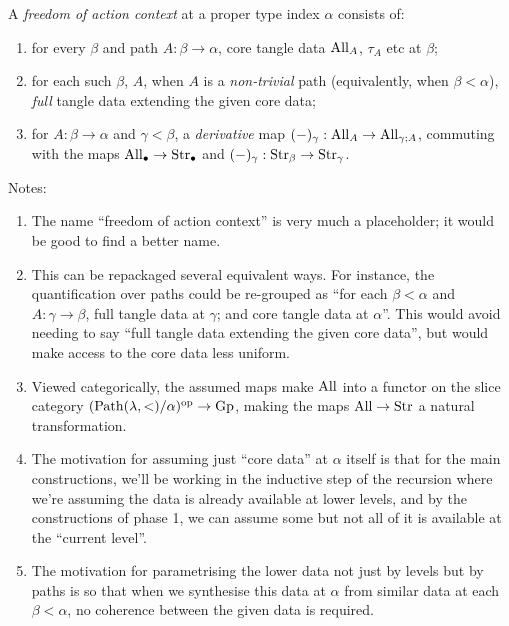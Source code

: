 \begin{definition}
  \label{def:foa-context}
  \leanok
  A \emph{freedom of action context} at a proper type index $\alpha$ consists of:

  \begin{enumerate}
  \item for every $\beta$ and path $A : \beta \to \alpha$, core tangle data $\mathrm{All}_A$, $\tau_A$ etc at $\beta$;
  \item for each such $\beta$, $A$, when $A$ is a \emph{non-trivial} path (equivalently, when $\beta < \alpha$), \emph{full} tangle data extending the given core data;
  \item for $A : \beta \to \alpha$ and $\gamma < \beta$, a \emph{derivative} map $(-)_\gamma : \mathrm{All}_{A} \to \mathrm{All}_{\gamma;A}$, commuting with the maps $\mathrm{All}_\bullet \to \mathrm{Str}_\bullet$ and $(-)_{\gamma} : \mathrm{Str}_\beta \to \mathrm{Str}_\gamma$.
  \end{enumerate}

  Notes:
  \begin{enumerate}
  \item The name “freedom of action context” is very much a placeholder; it would be good to find a better name.
  \item This can be repackaged several equivalent ways.  For instance, the quantification over paths could be re-grouped as “for each $\beta < \alpha$ and $A : \gamma \to \beta$, full tangle data at $\gamma$; and core tangle data at $\alpha$”.  This would avoid needing to say “full tangle data extending the given core data”, but would make access to the core data less uniform.
  \item Viewed categorically, the assumed maps make $\mathrm{All}$ into a functor on the slice category $(\mathrm{Path} (\lambda,<)/\alpha)^{\mathrm{op}} \to \mathrm{Gp}$, making the maps $\mathrm{All} \to \mathrm{Str}$ a natural transformation.
  \item The motivation for assuming just “core data” at $\alpha$ itself is that for the main constructions, we’ll be working in the inductive step of the recursion where we’re assuming the data is already available at lower levels, and by the constructions of phase 1, we can assume some but not all of it is available at the “current level”.
  \item The motivation for parametrising the lower data not just by levels but by paths is so that when we synthesise this data at $\alpha$ from similar data at each $\beta < \alpha$, no coherence between the given data is required.
  \end{enumerate}
\end{definition}

